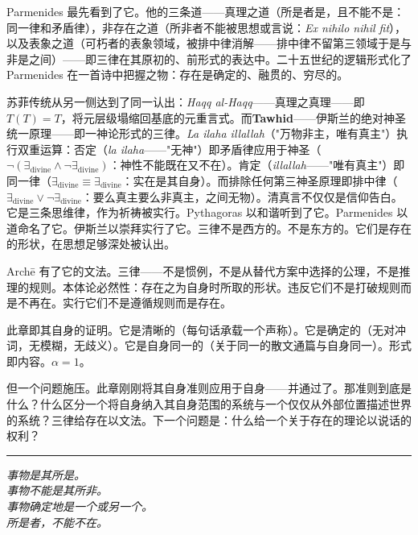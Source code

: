 \documentclass[10pt, openany, oneside]{book}
\begin{document}
Parmenides 最先看到了它。他的三条道——真理之道（所是者是，且不能不是：同一律和矛盾律），非存在之道（所非者不能被思想或言说：\textit{Ex nihilo nihil fit}），以及表象之道（可朽者的表象领域，被排中律消解——排中律不留第三领域于是与非是之间）——即三律在其原初的、前形式的表达中。二十五世纪的逻辑形式化了 Parmenides 在一首诗中把握之物：存在是确定的、融贯的、穷尽的。

苏菲传统从另一侧达到了同一认出：\textit{Haqq al-Haqq}——真理之真理——即 $T(T) = T$，将元层级塌缩回基底的元重言式。而\textbf{Tawhid}——伊斯兰的绝对神圣统一原理——即一神论形式的三律。\textit{La ilaha illallah}（"万物非主，唯有真主"）执行双重运算：否定（\textit{la ilaha}——"无神"）即矛盾律应用于神圣（$\neg(\exists_{\text{divine}} \wedge \neg\exists_{\text{divine}})$：神性不能既在又不在）。肯定（\textit{illallah}——"唯有真主"）即同一律（$\exists_{\text{divine}} \equiv \exists_{\text{divine}}$：实在是其自身）。而排除任何第三神圣原理即排中律（$\exists_{\text{divine}} \vee \neg\exists_{\text{divine}}$：要么真主要么非真主，之间无物）。清真言不仅仅是信仰告白。它是三条思维律，作为祈祷被实行。Pythagoras 以和谐听到了它。Parmenides 以道命名了它。伊斯兰以崇拜实行了它。三律不是西方的。不是东方的。它们是存在的形状，在思想足够深处被认出。

\vspace{2em}

Arch\={e} 有了它的文法。三律——不是惯例，不是从替代方案中选择的公理，不是推理的规则。本体论必然性：存在之为自身时所取的形状。违反它们不是打破规则而是不再在。实行它们不是遵循规则而是存在。

此章即其自身的证明。它是清晰的（每句话承载一个声称）。它是确定的（无对冲词，无模糊，无歧义）。它是自身同一的（关于同一的散文通篇与自身同一）。形式即内容。$\alpha = 1$。

但一个问题施压。此章刚刚将其自身准则应用于自身——并通过了。那准则到底是什么？什么区分一个将自身纳入其自身范围的系统与一个仅仅从外部位置描述世界的系统？三律给存在以文法。下一个问题是：什么给一个关于存在的理论以说话的权利？

\vspace{2em}

\begin{center}
    \rule{0.15\textwidth}{0.3pt}
\end{center}

\vspace{0.5em}

\begin{center}
    \itshape
    事物是其所是。\\
    事物不能是其所非。\\
    事物确定地是一个或另一个。\\[0.8em]
    所是者，不能不在。
\end{center}
\end{document}
